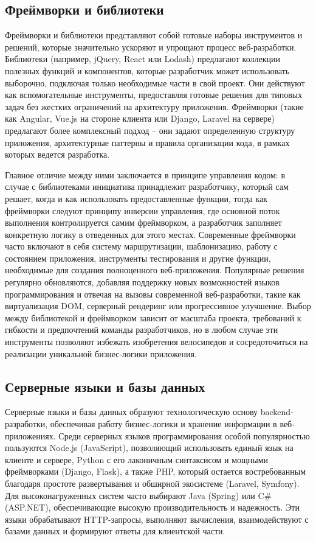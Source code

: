 \documentclass[referat]{SCWorks}
\begin{document}
\subsection{Фреймворки и библиотеки}

Фреймворки и библиотеки представляют собой готовые наборы инструментов и решений, которые значительно ускоряют и упрощают процесс веб-разработки. Библиотеки (например, jQuery, React или Lodash) предлагают коллекции полезных функций и компонентов, которые разработчик может использовать выборочно, подключая только необходимые части в свой проект. Они действуют как вспомогательные инструменты, предоставляя готовые решения для типовых задач без жестких ограничений на архитектуру приложения. Фреймворки (такие как Angular, Vue.js на стороне клиента или Django, Laravel на сервере) предлагают более комплексный подход -- они задают определенную структуру приложения, архитектурные паттерны и правила организации кода, в рамках которых ведется разработка.

Главное отличие между ними заключается в принципе управления кодом: в случае с библиотеками инициатива принадлежит разработчику, который сам решает, когда и как использовать предоставленные функции, тогда как фреймворки следуют принципу инверсии управления, где основной поток выполнения контролируется самим фреймворком, а разработчик заполняет конкретную логику в отведенных для этого местах. Современные фреймворки часто включают в себя систему маршрутизации, шаблонизацию, работу с состоянием приложения, инструменты тестирования и другие функции, необходимые для создания полноценного веб-приложения. Популярные решения регулярно обновляются, добавляя поддержку новых возможностей языков программирования и отвечая на вызовы современной веб-разработки, такие как виртуализация DOM, серверный рендеринг или прогрессивное улучшение. Выбор между библиотекой и фреймворком зависит от масштаба проекта, требований к гибкости и предпочтений команды разработчиков, но в любом случае эти инструменты позволяют избежать изобретения велосипедов и сосредоточиться на реализации уникальной бизнес-логики приложения.\cite{web_frameworks}

\subsection{Серверные языки и базы данных}

Серверные языки и базы данных образуют технологическую основу backend-разработки, обеспечивая работу бизнес-логики и хранение информации в веб-приложениях. Среди серверных языков программирования особой популярностью пользуются Node.js (JavaScript), позволяющий использовать единый язык на клиенте и сервере, Python с его лаконичным синтаксисом и мощными фреймворками (Django, Flask), а также PHP, который остается востребованным благодаря простоте развертывания и обширной экосистеме (Laravel, Symfony). Для высоконагруженных систем часто выбирают Java (Spring) или C\# (ASP.NET), обеспечивающие высокую производительность и надежность. Эти языки обрабатывают HTTP-запросы, выполняют вычисления, взаимодействуют с базами данных и формируют ответы для клиентской части.
\end{document}
